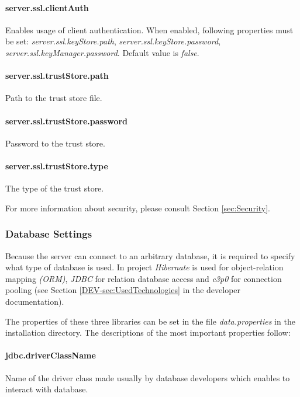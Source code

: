 \paragraph{server.ssl.clientAuth}
Enables usage of client authentication. When enabled, following properties must
be set: \emph{server.ssl.keyStore.path}, \emph{server.ssl.keyStore.password},
\emph{server.ssl.keyManager.password}. Default value is \emph{false}.

\paragraph{server.ssl.trustStore.path}
Path to the trust store file.

\paragraph{server.ssl.trustStore.password}
Password to the trust store.

\paragraph{server.ssl.trustStore.type}
The type of the trust store.

\vspace{0.75cm}
For more information about security, please consult Section \ref{sec:Security}.

\subsubsection{Database Settings}
\label{sssec:DataSettings}

Because the server can connect to an arbitrary database, it is required to
specify what type of database is used. In \textan{} project \emph{Hibernate}
is used for object-relation mapping \emph{(ORM)}, \emph{JDBC} for relation
database access and \emph{c3p0} for connection pooling (see Section
\ref{DEV-sec:UsedTechnologies} in the developer documentation).

The properties of these three libraries can be set in the file
\emph{data.properties} in the installation directory. The descriptions of the
most important properties follow:

\paragraph{jdbc.driverClassName}
Name of the driver class made usually by database developers which enables to
interact with database.

